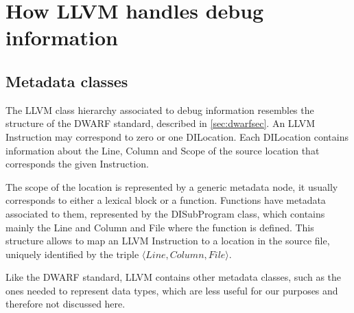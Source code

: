 \section{How LLVM handles debug information\label{sec:llvm-dbg}}

\subsection{Metadata classes}
The LLVM class hierarchy associated to debug information resembles the structure of the DWARF standard, described in \ref{sec:dwarfsec}.\newline 
An LLVM Instruction may correspond to zero or one DILocation. Each DILocation contains information about the Line, Column and Scope of the source location that corresponds the given Instruction. \par 
The scope of the location is represented by a generic metadata node, it usually corresponds to either a lexical block or a function. Functions have metadata associated to them, represented by the DISubProgram class, which contains mainly the Line and Column and File where the function is defined. This structure allows to map an LLVM Instruction to a location in the source file, uniquely identified by the triple $\langle Line, Column, File \rangle$. \par 
Like the DWARF standard, LLVM contains other metadata classes, such as the ones needed to represent data types, which are less useful for our purposes and therefore not discussed here.
